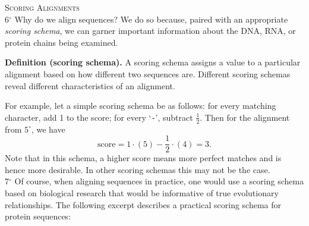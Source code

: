 \documentclass[a4paper]{article}
\begin{document}
\textsc{Scoring Alignments} \\

6$^\circ$ Why do we align sequences? We do so because, paired with an appropriate \emph{scoring schema}, we can garner important information about the DNA, RNA, or protein chains being examined. \\

\begin{adjustwidth}{.5in}{0pt}
\textbf{Definition (scoring schema).} A scoring schema assigns a value to a particular alignment based on how different two sequences are. Different scoring schemas reveal different characteristics of an alignment. \\
\end{adjustwidth}

For example, let a simple scoring schema be as follows: for every matching character, add 1 to the score; for every `\verb+-+', subtract $\tfrac{1}{2}$. Then for the alignment from $5^\circ$, we have
\[ \text{score} = 1\cdot(5) - \frac{1}{2}\cdot(4) = 3. \] 
Note that in this schema, a higher score means more perfect matches and is hence more desirable. In other scoring schemas this may not be the case. \\

7$^\circ$ Of course, when aligning sequences in practice, one would use a scoring schema based on biological research that would be informative of true evolutionary relationships. The following excerpt describes a practical scoring schema for protein sequences: \\
\end{document}
